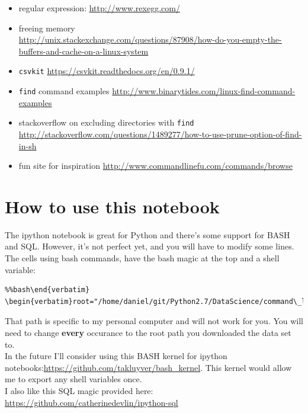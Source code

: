 \documentclass{article}
\begin{document}
\begin{itemize}
\itemsep1pt\parskip0pt
\item
    regular expression: \url{http://www.rexegg.com/}
\item
  freeing memory \\
  \url{http://unix.stackexchange.com/questions/87908/how-do-you-empty-the-buffers-and-cache-on-a-linux-system}
\item
    \texttt{csvkit} \url{https://csvkit.readthedocs.org/en/0.9.1/}
\item
  \texttt{find} command examples
  \url{http://www.binarytides.com/linux-find-command-examples}
\item
  stackoverflow on excluding directories with \texttt{find}
  \url{http://stackoverflow.com/questions/1489277/how-to-use-prune-option-of-find-in-sh}
\item
    fun site for inspiration \url{http://www.commandlinefu.com/commands/browse}
\end{itemize}

\section{How to use this notebook}\label{how-to-use-this-notebook}

The ipython notebook is great for Python and there's some support for
BASH and SQL. However, it's not perfect yet, and you will have to modify
some lines.\\

The cells using bash commands, have the bash magic at the top and a
shell variable:
\begin{verbatim}%%bash\end{verbatim}
\begin{verbatim}root="/home/daniel/git/Python2.7/DataScience/command\_line\_pres\_data"\end{verbatim}

    That path is specific to my personal computer and will not work for you.
You will need to change \textbf{every} occurance to the root path you
downloaded the data set to.\\

In the future I'll consider using this BASH kernel for ipython
notebooks:\url{https://github.com/takluyver/bash\_kernel}. This kernel would
allow me to export any shell variables once.\\

I also like this SQL magic provided here:
\url{https://github.com/catherinedevlin/ipython-sql}\\
\end{document}

